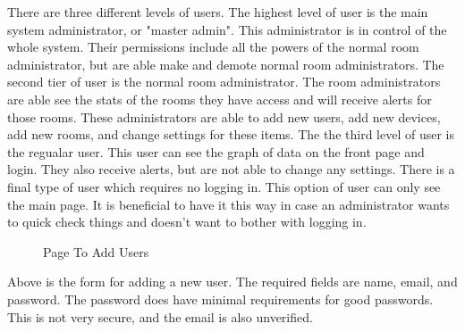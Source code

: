\documentclass{report}
\begin{document}
\indent
There are three different levels of users. The highest level of user is the main system administrator, or "master admin". This administrator is in control of the whole system. Their permissions include all the powers of the normal room administrator, but are able make and demote normal room administrators. 
\newline
\indent
The second tier of user is the normal room administrator. The room administrators are able see the stats of the rooms they have access and will receive alerts for those rooms. These administrators are able to add new users, add new devices, add new rooms, and change settings for these items.
\newline
\indent
The the third level of user is the regualar user. This user can see the graph of data on the front page and login. They also receive alerts, but are not able to change any settings.
\newline
\indent
There is a final type of user which requires no logging in. This option of user can only see the main page. It is beneficial to have it this way in case an administrator wants to quick check things and doesn't want to bother with logging in.
\begin{figure}[H]
	\caption{Page To Add Users}
\end{figure}
\indent
Above is the form for adding a new user. The required fields are name, email, and password. The password does have minimal requirements for good passwords. This is not very secure, and the email is also unverified.
\newpage
\end{document}
